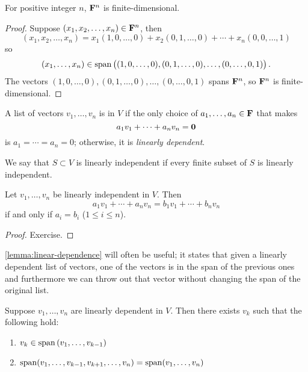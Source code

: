 \begin{exercise}
For positive integer $n$, $\mathbf F^n$ is finite-dimensional.
\end{exercise}

\begin{proof}
Suppose $(x_1,x_2,\dots,x_n)\in\mathbf F^n$, then
\[(x_1,x_2,\dots,x_n)=x_1(1,0,\dots,0)+x_2(0,1,\dots,0)+\cdots+x_n(0,0,\dots,1)\]
so
\[(x_1,\dots,x_n)\in\operatorname{span}\left((1,0,\dots,0),(0,1,\dots,0),\dots,(0,\dots,0,1)\right).\]
The vectors $(1,0,\dots,0),(0,1,\dots,0),\dots,(0,\dots,0,1)$ spans $\mathbf F^n$, so $\mathbf F^n$ is finite-dimensional.
\end{proof}

\begin{definition}\label{def:linear-independence}
A list of vectors $v_1,\dots,v_n$ is  in $V$ if the only choice of $a_1,\dots,a_n\in\mathbf F$ that makes
\[a_1v_1+\cdots+a_nv_n=\vb{0}\]
is $a_1=\cdots=a_n=0$; otherwise, it is \emph{linearly dependent}.

We say that $S\subset V$ is linearly independent if every finite subset of $S$ is linearly independent.
\end{definition}

\begin{proposition}
Let $v_1,\dots,v_n$ be linearly independent in $V$. Then
\[a_1v_1+\cdots+a_nv_n=b_1v_1+\cdots+b_nv_n\]
if and only if $a_i=b_i$ ($1\le i\le n$).
\end{proposition}

\begin{proof}
Exercise.
\end{proof}

\cref{lemma:linear-dependence} will often be useful; it states that given a linearly dependent list of vectors, one of the vectors is in the span of the previous ones and furthermore we can throw out that vector without changing the span of the original list.

\begin{lemma}\label{lemma:linear-dependence}
Suppose $v_1,\dots,v_n$ are linearly dependent in $V$. Then there exists $v_k$ such that the following hold:
\begin{enumerate}[label=(\roman*)]
\item $v_k\in\operatorname{span}\left(v_1,\dots,v_{k-1}\right)$
\item $\operatorname{span}(v_1,\dots,v_{k-1},v_{k+1},\dots,v_n)=\operatorname{span}(v_1,\dots,v_n)$
\end{enumerate}
\end{lemma}

